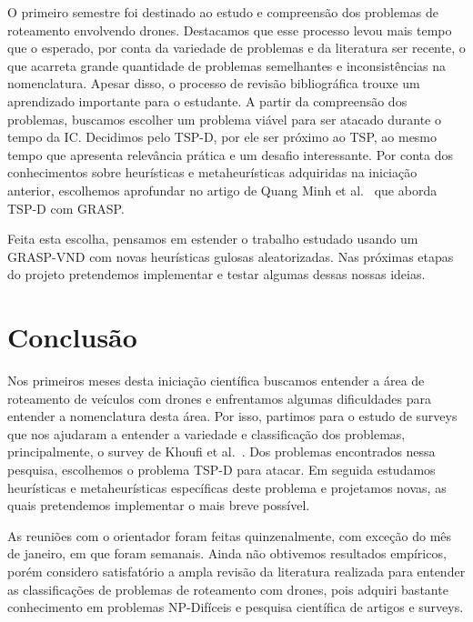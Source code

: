 \documentclass[12pt, a4paper]{article}
\begin{document}
O primeiro semestre foi destinado ao estudo e compreensão dos problemas de roteamento envolvendo drones. Destacamos que esse processo levou mais tempo que o esperado, por conta da variedade de problemas e da literatura ser recente, o que acarreta grande quantidade de problemas semelhantes e inconsistências na nomenclatura. Apesar disso, o processo de revisão bibliográfica trouxe um aprendizado importante para o estudante. A partir da compreensão dos problemas, buscamos escolher um problema viável para ser atacado durante o tempo da IC. Decidimos pelo TSP-D, por ele ser próximo ao TSP, ao mesmo tempo que apresenta relevância prática e um desafio interessante. Por conta dos conhecimentos sobre heurísticas e metaheurísticas adquiridas na iniciação anterior, escolhemos aprofundar no artigo de Quang Minh et al.~\cite{ha2018min} que aborda TSP-D com GRASP.\par 
Feita esta escolha, pensamos em estender o trabalho estudado usando um GRASP-VND com novas heurísticas gulosas aleatorizadas. Nas próximas etapas do projeto pretendemos implementar e testar algumas dessas nossas ideias. %


\section{Conclusão}\label{sec:concl}

Nos primeiros meses desta iniciação científica buscamos entender a área de roteamento de veículos com drones e enfrentamos algumas dificuldades para entender a nomenclatura desta área. Por isso, partimos para o estudo de surveys que nos ajudaram a entender a variedade e classificação dos problemas, principalmente, o survey de Khoufi et al.~\cite{khoufi2019survey}. Dos problemas encontrados nessa pesquisa, escolhemos o problema TSP-D para atacar.
Em seguida estudamos heurísticas e metaheurísticas específicas deste problema e projetamos novas, as quais pretendemos implementar o mais breve possível. \par
As reuniões com o orientador foram feitas quinzenalmente, com exceção do mês de janeiro, em que foram semanais. Ainda não obtivemos resultados empíricos, porém considero satisfatório a ampla revisão da literatura realizada para entender as classificações de problemas de roteamento com drones, pois adquiri bastante conhecimento em problemas NP-Difíceis e pesquisa científica de artigos e surveys.\par 





\end{document}
